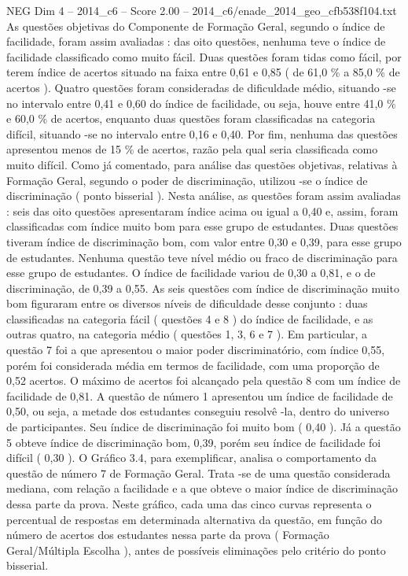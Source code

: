 \begin{textsample}{NEG Dim 4 – 2014\_c6 – Score 2.00 – 2014\_c6/enade\_2014\_geo\_cfb538f104.txt}
As questões objetivas do Componente de Formação Geral, segundo o índice de facilidade, foram assim avaliadas : das oito questões, nenhuma teve o índice de facilidade classificado como muito fácil.
Duas questões foram tidas como fácil, por terem índice de acertos situado na faixa entre 0,61 e 0,85 ( de 61,0 \% a 85,0 \% de acertos ).
Quatro questões foram consideradas de dificuldade médio, situando -se no intervalo entre 0,41 e 0,60 do índice de facilidade, ou seja, houve entre 41,0 \% e 60,0 \% de acertos, enquanto duas questões foram classificadas na categoria difícil, situando -se no intervalo entre 0,16 e 0,40.
Por fim, nenhuma das questões apresentou menos de 15 \% de acertos, razão pela qual seria classificada como muito difícil.
Como já comentado, para análise das questões objetivas, relativas à Formação Geral, segundo o poder de discriminação, utilizou -se o índice de discriminação ( ponto bisserial ).
Nesta análise, as questões foram assim avaliadas : seis das oito questões apresentaram índice acima ou igual a 0,40 e, assim, foram classificadas com índice muito bom para esse grupo de estudantes.
Duas questões tiveram índice de discriminação bom, com valor entre 0,30 e 0,39, para esse grupo de estudantes.
Nenhuma questão teve nível médio ou fraco de discriminação para esse grupo de estudantes.
O índice de facilidade variou de 0,30 a 0,81, e o de discriminação, de 0,39 a 0,55.
As seis questões com índice de discriminação muito bom figuraram entre os diversos níveis de dificuldade desse conjunto : duas classificadas na categoria fácil ( questões 4 e 8 ) do índice de facilidade, e as outras quatro, na categoria médio ( questões 1, 3, 6 e 7 ).
Em particular, a questão 7 foi a que apresentou o maior poder discriminatório, com índice 0,55, porém foi considerada média em termos de facilidade, com uma proporção de 0,52 acertos.
O máximo de acertos foi alcançado pela questão 8 com um índice de facilidade de 0,81.
A questão de número 1 apresentou um índice de facilidade de 0,50, ou seja, a metade dos estudantes conseguiu resolvê -la, dentro do universo de participantes.
Seu índice de discriminação foi muito bom ( 0,40 ).
Já a questão 5 obteve índice de discriminação bom, 0,39, porém seu índice de facilidade foi difícil ( 0,30 ).
O Gráfico 3.4, para exemplificar, analisa o comportamento da questão de número 7 de Formação Geral.
Trata -se de uma questão considerada mediana, com relação a facilidade e a que obteve o maior índice de discriminação dessa parte da prova.
Neste gráfico, cada uma das cinco curvas representa o percentual de respostas em determinada alternativa da questão, em função do número de acertos dos estudantes nessa parte da prova ( Formação Geral/Múltipla Escolha ), antes de possíveis eliminações pelo critério do ponto bisserial.

\end{textsample}
